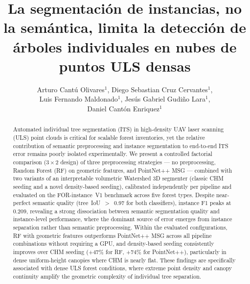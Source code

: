 \documentclass{cys}
\begin{document}

\title{La segmentación de instancias, no la semántica, limita la detección de árboles individuales en nubes de puntos ULS densas}

\author{Arturo Cantú Olivares$^1$, Diego Sebastian Cruz Cervantes$^1$, \\ Luis Fernando Maldonado$^1$, Jesús Gabriel Gudiño Lara$^1$, \\ Daniel Cantón Enriquez$^1$}


\maketitle

\renewcommand{\tablename}{Tabla}


\begin{abstract}
Automated individual tree segmentation (ITS) in high-density UAV laser scanning (ULS) point clouds is critical for scalable forest inventories, yet the relative contribution of semantic preprocessing and instance segmentation to end-to-end ITS error remains poorly isolated experimentally. We present a controlled factorial comparison ($3 \times 2$ design) of three preprocessing strategies --- no preprocessing, Random Forest (RF) on geometric features, and PointNet++ MSG --- combined with two variants of an interpretable volumetric Watershed 3D segmenter (classic CHM seeding and a novel density-based seeding), calibrated independently per pipeline and evaluated on the FOR-instance~V1 benchmark across five forest types. Despite near-perfect semantic quality (tree~IoU~$>$~0.97 for both classifiers), instance F1 peaks at 0.209, revealing a strong dissociation between semantic segmentation quality and instance-level performance, where the dominant source of error emerges from instance separation rather than semantic preprocessing. Within the evaluated configurations, RF with geometric features outperforms PointNet++ MSG across all pipeline combinations without requiring a GPU, and density-based seeding consistently improves over CHM seeding (+47\% for RF, +74\% for PointNet++), particularly in dense uniform-height canopies where CHM is nearly flat. These findings are specifically associated with dense ULS forest conditions, where extreme point density and canopy continuity amplify the geometric complexity of individual tree separation.
\end{abstract}
\end{document}
